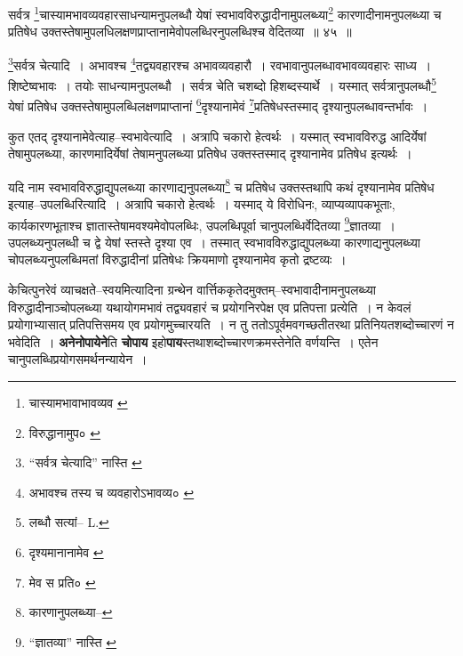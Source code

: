 \documentclass[article,12pt,a4paper]{memoir}
\begin{document}
	  \bigskip
	  \begingroup
	

	  \pstart सर्वत्र \footnote{चास्यामभावाभावव्यव \cite{dp-edE}}चास्यामभावव्यवहारसाधन्यामनुपलब्धौ येषां स्वभावविरुद्धादीनामुपलब्ध्या\footnote{विरुद्धानामुप० \cite{dp-msC}} कारणादीनामनुपलब्ध्या च प्रतिषेध उक्तस्तेषामुपलधिलक्षणप्राप्तानामेवोपलब्धिरनुपलब्धिश्च वेदितव्या ॥ ४५ ॥
	\pend
      
	  \endgroup
	 

	  \pstart \footnote{“सर्वत्र चेत्यादि” नास्ति \cite{dp-edH} \cite{dp-edN}}सर्वत्र चेत्यादि । अभावश्च \footnote{अभावश्च तस्य च व्यवहारोऽभावव्य० \cite{dp-msA} \cite{dp-edP} \cite{dp-edH} \cite{dp-edE}}तद्व्यवहारश्च अभावव्यवहारौ । रवभावानुपलब्धावभावव्यवहारः साध्य । शिष्टेष्वभावः । तयोः साधन्यामनुपलब्धौ । सर्वत्र चेति चशब्दो हिशब्दस्यार्थे । यस्मात् सर्वत्रानुपलब्धौ\footnote{लब्धौ सत्यां--\cite{dp-msB} \cite{dp-edH} L.} येषां प्रतिषेध उक्तस्तेषामुपलब्धिलक्षणप्राप्तानां \footnote{दृश्यमानानामेव \cite{dp-msB}}दृश्यानामेवं \footnote{मेव स प्रति० \cite{dp-msA} \cite{dp-edP} \cite{dp-edH} \cite{dp-edE} \cite{dp-edN}}प्रतिषेधस्तस्माद् दृश्यानुपलब्धावन्तर्भावः ।
	\pend
       

	  \pstart कुत एतद् दृश्यानामेवेत्याह--स्वभावेत्यादि । अत्रापि चकारो हेत्वर्थः । यस्मात् स्वभावविरुद्ध आदिर्येषां तेषामुपलब्ध्या, कारणमादिर्येषां तेषामनुपलब्ध्या प्रतिषेध उक्तस्तस्माद् दृश्यानामेव प्रतिषेध इत्यर्थः ।
	\pend
       

	  \pstart यदि नाम स्वभावविरुद्धाद्युपलब्ध्या कारणाद्यनुपलब्ध्या\footnote{कारणानुपलब्ध्या--\cite{dp-msC}} च प्रतिषेध उक्तस्तथापि कथं दृश्यानामेव प्रतिषेध इत्याह--उपलब्धिरित्यादि । अत्रापि चकारो हेत्वर्थः । यस्माद् ये विरोधिनः, व्याप्यव्यापकभूताः, कार्यकारणभूताश्च ज्ञातास्तेषामवश्यमेवोपलब्धिः, उपलब्धिपूर्वा चानुपलब्धिर्वेदितव्या \footnote{“ज्ञातव्या” नास्ति \cite{dp-msA} \cite{dp-msB} \cite{dp-edP} \cite{dp-edH} \cite{dp-edE} \cite{dp-edN}}ज्ञातव्या । उपलब्ध्यनुपलब्धी च द्वे येषां स्तस्ते दृश्या एव । तस्मात् स्वभावविरुद्धाद्युपलब्ध्या कारणाद्यनुपलब्ध्या चोपलब्ध्यनुपलब्धिमतां विरुद्धादीनां प्रतिषेधः क्रियमाणो दृश्यानामेव कृतो द्रष्टव्यः ।
	\pend
      
	  \endgroup
	

	  \pstart केचित्पुनरेवं व्याचक्षते--स्वयमित्यादिना ग्रन्थेन वार्त्तिककृतेदमुक्तम्--स्वभावादीनामनुपलब्ध्या विरुद्धादीनाञ्चोपलब्ध्या यथायोगमभावं तद्व्यवहारं च प्रयोगनिरपेक्ष एव प्रतिपत्ता प्रत्येति । न केवलं प्रयोगाभ्यासात् प्रतिपत्तिसमय एव प्रयोगमुच्चारयति । न तु ततोऽपूर्वमवगच्छतीतरथा प्रतिनियतशब्दोच्चारणं न भवेदिति । \textbf{अनेनोपायेने}ति \textbf{चोपाय} इहो\textbf{पाय}स्तथाशब्दोच्चारणक्रमस्तेनेति वर्णयन्ति । एतेन चानुपलब्धिप्रयोगसमर्थनन्यायेन ।
	\pend
      \leavevmode{}
	  \bigskip
	  \begingroup
	
\end{document}
